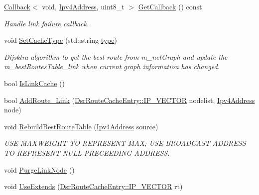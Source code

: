 \begin{DoxyCompactItemize}
\hyperlink{classns3_1_1Callback}{Callback}$<$ void, \hyperlink{classns3_1_1Ipv4Address}{Ipv4\+Address}, uint8\+\_\+t $>$ \hyperlink{classns3_1_1dsr_1_1DsrRouteCache_a95e45b0d9b788e926acfdd8666732399}{Get\+Callback} () const 
\begin{DoxyCompactList}\small\item\em Handle link failure callback. \end{DoxyCompactList}\item 
void \hyperlink{classns3_1_1dsr_1_1DsrRouteCache_a2076176adf8cb2c75770b0df74b04e12}{Set\+Cache\+Type} (std\+::string \hyperlink{visualizer-ideas_8txt_add98db9e15e2a58cf2b57623e7aa893a}{type})
\begin{DoxyCompactList}\small\item\em Dijsktra algorithm to get the best route from m\+\_\+net\+Graph and update the m\+\_\+best\+Routes\+Table\+\_\+link when current graph information has changed. \end{DoxyCompactList}\item 
bool \hyperlink{classns3_1_1dsr_1_1DsrRouteCache_a3ec7cfaaf07c337cf71aa21793059293}{Is\+Link\+Cache} ()
\item 
bool \hyperlink{classns3_1_1dsr_1_1DsrRouteCache_a75cc32c929563b2a44ad73b2fda9c577}{Add\+Route\+\_\+\+Link} (\hyperlink{classns3_1_1dsr_1_1DsrRouteCacheEntry_ab834177006bdbfd2e3fa607c2a88cbdf}{Dsr\+Route\+Cache\+Entry\+::\+I\+P\+\_\+\+V\+E\+C\+T\+OR} nodelist, \hyperlink{classns3_1_1Ipv4Address}{Ipv4\+Address} node)
\item 
void \hyperlink{classns3_1_1dsr_1_1DsrRouteCache_a1b90d61ebb580a83ee9c1306bbc230dd}{Rebuild\+Best\+Route\+Table} (\hyperlink{classns3_1_1Ipv4Address}{Ipv4\+Address} source)
\begin{DoxyCompactList}\small\item\em U\+SE M\+A\+X\+W\+E\+I\+G\+HT TO R\+E\+P\+R\+E\+S\+E\+NT M\+AX; U\+SE B\+R\+O\+A\+D\+C\+A\+ST A\+D\+D\+R\+E\+SS TO R\+E\+P\+R\+E\+S\+E\+NT N\+U\+LL P\+R\+E\+C\+E\+E\+D\+I\+NG A\+D\+D\+R\+E\+SS. \end{DoxyCompactList}\item 
void \hyperlink{classns3_1_1dsr_1_1DsrRouteCache_a0a053ff3dc1d3872188e85e30d1afb7e}{Purge\+Link\+Node} ()
\item 
void \hyperlink{classns3_1_1dsr_1_1DsrRouteCache_a806392bc615a83d0b3e3f251ab9d1fdf}{Use\+Extends} (\hyperlink{classns3_1_1dsr_1_1DsrRouteCacheEntry_ab834177006bdbfd2e3fa607c2a88cbdf}{Dsr\+Route\+Cache\+Entry\+::\+I\+P\+\_\+\+V\+E\+C\+T\+OR} rt)
\item 

\end{DoxyCompactItemize}
